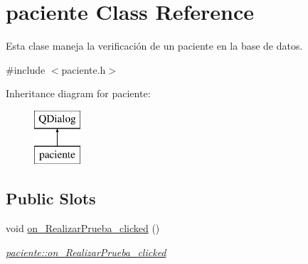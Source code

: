 \hypertarget{classpaciente}{}\section{paciente Class Reference}
\label{classpaciente}


Esta clase maneja la verificación de un paciente en la base de datos.  




{\ttfamily \#include $<$paciente.\+h$>$}

Inheritance diagram for paciente\+:\begin{figure}[H]
\begin{center}
\leavevmode
\includegraphics[height=2.000000cm]{classpaciente}
\end{center}
\end{figure}
\subsection*{Public Slots}
\begin{DoxyCompactItemize}
\item 
void \hyperlink{classpaciente_a6d34393d2eb8c21d66135346651a4995}{on\+\_\+\+Realizar\+Prueba\+\_\+clicked} ()
\begin{DoxyCompactList}\small\item\em \hyperlink{classpaciente_a6d34393d2eb8c21d66135346651a4995}{paciente\+::on\+\_\+\+Realizar\+Prueba\+\_\+clicked} \end{DoxyCompactList}\end{DoxyCompactItemize}
